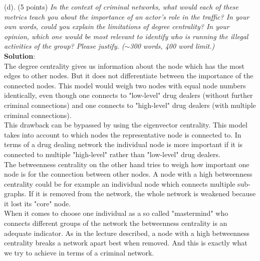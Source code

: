 (d). (5 points) \textsl{In the context of criminal networks, what would each of these metrics teach you about the importance of an actor's role in the traffic? In your own words, could you explain the limitations of degree centrality? In your opinion, which one would be most relevant to identify who is running the illegal activities of the group? Please justify. ($\sim$300 words, 400 word limit.)}\\

\textbf{Solution}:\\
The degree centrality gives us information about the node which has the most edges to other nodes. But it does not differentiate between the importance of the connected nodes. This model would weigh two nodes with equal node numbers identically, even though one connects to "low-level" drug dealers (without further criminal connections) and one connects to "high-level" drug dealers (with multiple criminal connections).\\

This drawback can be bypassed by using the eigenvector centrality. This model takes into account to which nodes the representative node is connected to. In terms of a drug dealing network the individual node is more important if it is connected to multiple "high-level" rather than "low-level" drug dealers.\\

The betweenness centrality on the other hand tries to weigh how important one node is for the connection between other nodes. A node with a high betweenness centrality could be for example an individual node which connects multiple sub-graphs. If it is removed from the network, the whole network is weakened because it lost its "core" node.\\

When it comes to choose one individual as a so called "mastermind" who connects different groups of the network the betweenness centrality is an adequate indicator. As in the lecture described, a node with a high betweenness centrality breaks a network apart best when removed. And this is exactly what we try to achieve in terms of a criminal network.\\